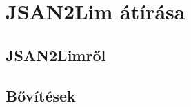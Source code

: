 \chapter{JSAN2Lim átírása}\label{chap:JSAN2Lim átírása}

\section{JSAN2Limről}
\section{Bővítések}

